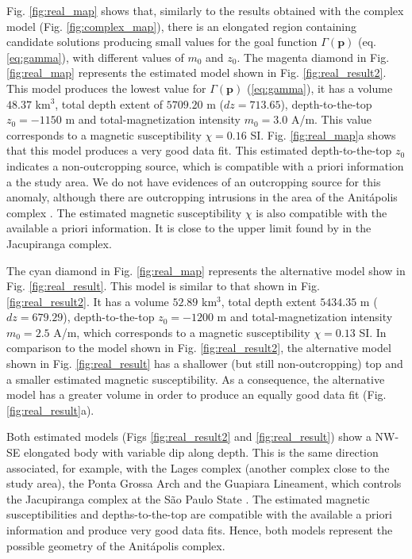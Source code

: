 Fig. \ref{fig:real_map} shows that, similarly to the results obtained with the 
complex model (Fig. \ref{fig:complex_map}), there is an elongated region containing 
candidate solutions producing small values for the goal function 
$\Gamma(\mathbf{p})$ (eq. \ref{eq:gamma}), with different values of $m_0$ and $z_0$.
The magenta diamond in Fig. \ref{fig:real_map} represents the estimated model 
shown in Fig. \ref{fig:real_result2}. 
This model produces the lowest value for $ \Gamma(\mathbf{p}) $ (\ref{eq:gamma}),
it has a volume $ 48.37 $ km$ ^3 $, total depth extent of $ 5709.20 $ m 
($ dz = 713.65 $), depth-to-the-top $z_0 = -1150$ m and total-magnetization intensity 
$m_0 = 3.0$ A/m. This value corresponds to a magnetic susceptibility 
$\chi = 0.16$ SI.
Fig. \ref{fig:real_map}a shows that this model produces a very good data fit.
This estimated depth-to-the-top $z_0$ indicates a non-outcropping source, 
which is compatible with a priori information a the study area. 
We do not have evidences of an outcropping source for this anomaly, 
although there are outcropping intrusions in the area of the Anit{\'a}polis 
complex \cite[]{gibson-1999}.
The estimated magnetic susceptibility $ \chi $ is also compatible with the 
available a priori information. It is close to the upper limit found by 
\citet{valdivia-2009} in the Jacupiranga complex.

The cyan diamond in Fig. \ref{fig:real_map} represents the alternative model 
show in Fig. \ref{fig:real_result}. This model is similar to that shown in 
Fig. \ref{fig:real_result2}. It has a volume $ 52.89 $ km$ ^3 $, total depth extent 
$ 5434.35 $ m ($ dz = 679.29 $), depth-to-the-top $z_0 = -1200$ m and 
total-magnetization intensity $m_0 = 2.5$ A/m, which corresponds to a magnetic 
susceptibility $\chi = 0.13$ SI. 
In comparison to the model shown in Fig. \ref{fig:real_result2}, the alternative model 
shown in Fig. \ref{fig:real_result} has a shallower (but still non-outcropping) top
and a smaller estimated magnetic susceptibility. As a consequence, the alternative 
model has a greater volume in order to produce an equally good data fit 
(Fig. \ref{fig:real_result}a).

Both estimated models (Figs \ref{fig:real_result2} and \ref{fig:real_result}) show 
a NW-SE elongated body with variable dip along depth.
This is the same direction associated, for example, with the Lages complex (another 
complex close to the study area), the Ponta Grossa Arch and the Guapiara Lineament,
which controls the Jacupiranga complex at the S{\~a}o Paulo State 
\citep{GOMES2018}.
The estimated magnetic susceptibilities and depths-to-the-top are compatible with 
the available a priori information and produce very good data fits.
Hence, both models represent the possible geometry of the Anit{\'a}polis complex. 